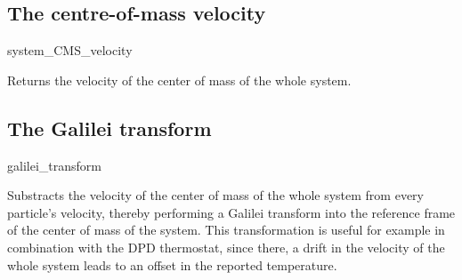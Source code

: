 \subsection{The centre-of-mass velocity}

\begin{essyntax}
  system_CMS_velocity
\end{essyntax}
Returns the velocity of the center of mass of the whole system.

\subsection{The Galilei transform}

\begin{essyntax}
  galilei_transform
\end{essyntax}
Substracts the velocity of the center of mass of the whole system from
every particle's velocity, thereby performing a Galilei transform into
the reference frame of the center of mass of the system. This
transformation is useful for example in combination with the DPD
thermostat, since there, a drift in the velocity of the whole system
leads to an offset in the reported temperature.

